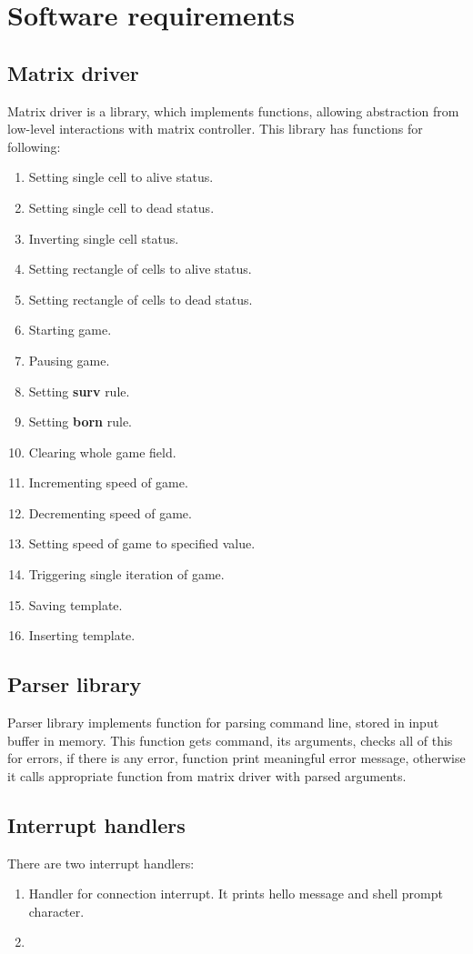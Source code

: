 \chapter*{Software requirements}

\section*{Matrix driver}

Matrix driver is a library, which implements functions, allowing abstraction from low-level interactions with matrix controller. This library has functions for following:

\begin{enumerate}
	\item Setting single cell to alive status.
	\item Setting single cell to dead status.
	\item Inverting single cell status.
	\item Setting rectangle of cells to alive status.
	\item Setting rectangle of cells to dead status.
	\item Starting game.
	\item Pausing game.
	\item Setting \textbf{surv} rule.
	\item Setting \textbf{born} rule.
	\item Clearing whole game field.
	\item Incrementing speed of game.
	\item Decrementing speed of game.
	\item Setting speed of game to specified value.
	\item Triggering single iteration of game.
	\item Saving template.
	\item Inserting template.
\end{enumerate}

\section*{Parser library}

Parser library implements function for parsing command line, stored in input buffer in memory. This function gets command, its arguments, checks all of this for errors, if there is any error, function print meaningful error message, otherwise it calls appropriate function from matrix driver with parsed arguments.

\section*{Interrupt handlers}

There are two interrupt handlers:

\begin{enumerate}
	\item Handler for connection interrupt. It prints hello message and shell prompt character.
	\item 
\end{enumerate}
